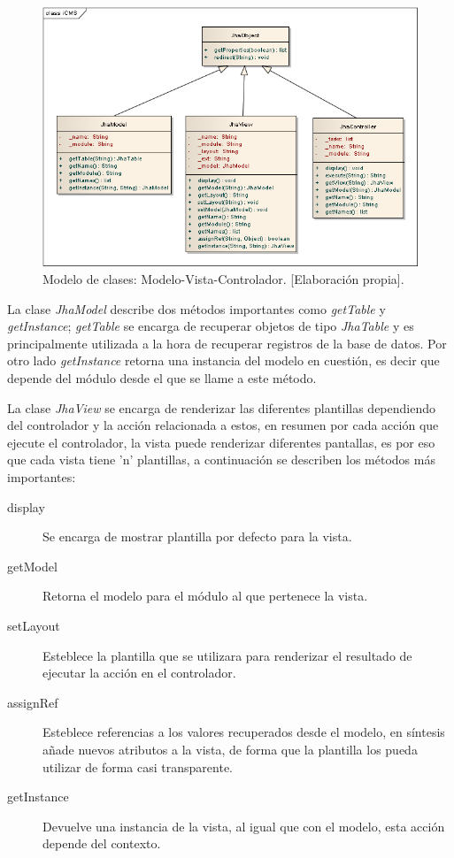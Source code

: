 \begin{figure}[h]
\centering
\includegraphics[scale=.65, keepaspectratio=true]{imagenes/09_imagen.png}
\caption{Modelo de clases: Modelo-Vista-Controlador. [Elaboraci\'on propia].}
\end{figure}

La clase \emph{JhaModel} describe dos m\'etodos importantes como \emph{getTable} y \emph{getInstance}; \emph{getTable} se encarga de recuperar objetos de tipo \emph{JhaTable} y es principalmente utilizada a la hora de recuperar registros de la base de datos. Por otro lado \emph{getInstance} retorna una instancia del modelo en cuesti\'on, es decir que depende del m\'odulo desde el que se llame a este m\'etodo.



La clase \emph{JhaView} se encarga de renderizar las diferentes plantillas dependiendo del controlador y la acci\'on relacionada a estos, en resumen por cada acci\'on que ejecute el controlador, la vista puede renderizar diferentes pantallas, es por eso que cada vista tiene 'n' plantillas, a continuaci\'on se describen los m\'etodos m\'as importantes:
\begin{description}
\item[display] Se encarga de mostrar plantilla por defecto para la vista.
\item[getModel] Retorna el modelo para el m\'odulo al que pertenece la vista.
\item[setLayout] Esteblece la plantilla que se utilizara para renderizar el resultado de ejecutar la acci\'on en el controlador.
\item[assignRef] Esteblece referencias a los valores recuperados desde el modelo, en s\'intesis a\~nade nuevos atributos a la vista, de forma que la plantilla los pueda utilizar de forma casi transparente.
\item[getInstance] Devuelve una instancia de la vista, al igual que con el modelo, esta acci\'on depende del contexto.
\end{description}

